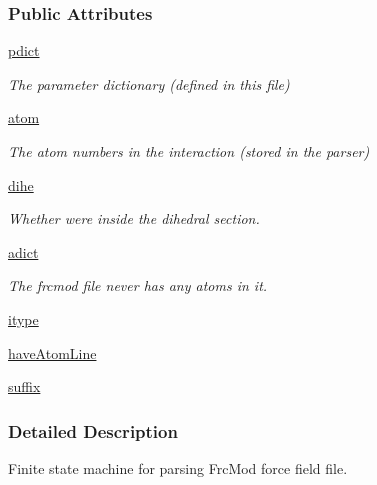 \subsubsection*{Public Attributes}
\begin{DoxyCompactItemize}
\item 
\hyperlink{classsrc_1_1amberio_1_1FrcMod__Reader_a092ccdf66bcdb2cbe7055976f8c28692}{pdict}
\begin{DoxyCompactList}\small\item\em The parameter dictionary (defined in this file) \end{DoxyCompactList}\item 
\hyperlink{classsrc_1_1amberio_1_1FrcMod__Reader_a65e6938b4f227e59d70fa7396d0f886c}{atom}
\begin{DoxyCompactList}\small\item\em The atom numbers in the interaction (stored in the parser) \end{DoxyCompactList}\item 
\hyperlink{classsrc_1_1amberio_1_1FrcMod__Reader_ae060143c69c47c451a2672207fa3897f}{dihe}
\begin{DoxyCompactList}\small\item\em Whether we\textquotesingle{}re inside the dihedral section. \end{DoxyCompactList}\item 
\hyperlink{classsrc_1_1amberio_1_1FrcMod__Reader_a82b9c0b5a62702f5dfee3c184fc53c3a}{adict}
\begin{DoxyCompactList}\small\item\em The frcmod file never has any atoms in it. \end{DoxyCompactList}\item 
\hyperlink{classsrc_1_1amberio_1_1FrcMod__Reader_a20700e7532ced1e35920d60fd427cfc6}{itype}
\item 
\hyperlink{classsrc_1_1amberio_1_1FrcMod__Reader_a8a520334a1ed4fdbea0796e4e22420f0}{have\+Atom\+Line}
\item 
\hyperlink{classsrc_1_1amberio_1_1FrcMod__Reader_a1dec6c8365204e03c9dc27b9fa07bfa6}{suffix}
\end{DoxyCompactItemize}


\subsubsection{Detailed Description}
Finite state machine for parsing Frc\+Mod force field file. 



